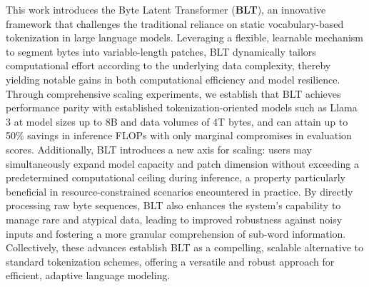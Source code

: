 This work introduces the Byte Latent Transformer (\textbf{BLT}), an innovative framework that challenges the traditional reliance on static vocabulary-based tokenization in large language models. Leveraging a flexible, learnable mechanism to segment bytes into variable-length patches, {\textsc BLT} dynamically tailors computational effort according to the underlying data complexity, thereby yielding notable gains in both computational efficiency and model resilience. Through comprehensive scaling experiments, we establish that {\textsc BLT} achieves performance parity with established tokenization-oriented models such as Llama 3 at model sizes up to 8B and data volumes of 4T bytes, and can attain up to 50\% savings in inference FLOPs with only marginal compromises in evaluation scores. Additionally, {\textsc BLT} introduces a new axis for scaling: users may simultaneously expand model capacity and patch dimension without exceeding a predetermined computational ceiling during inference, a property particularly beneficial in resource-constrained scenarios encountered in practice. By directly processing raw byte sequences, {\textsc BLT} also enhances the system’s capability to manage rare and atypical data, leading to improved robustness against noisy inputs and fostering a more granular comprehension of sub-word information. Collectively, these advances establish {\textsc BLT} as a compelling, scalable alternative to standard tokenization schemes, offering a versatile and robust approach for efficient, adaptive language modeling.

